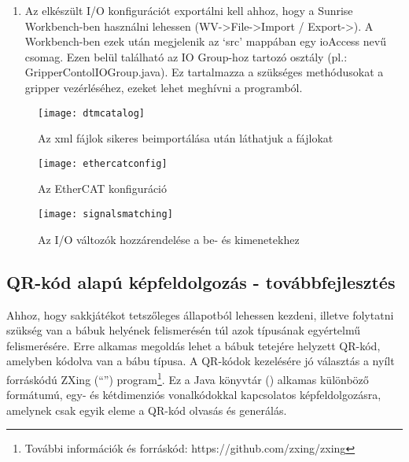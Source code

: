 \documentclass[../documentation.tex]{subfiles}
\begin{document}
\begin{enumerate}
	\begin{itemize}
		\item OpenGripper: bool, output, digital
		\item CloseGripper: bool, output, digital
		\item Status: bool, input, digital
	\end{itemize}
Az egyes változókat a kívánt bemenetekkel és kimenetekkel  módszerrel lehet összerendelni (\ref{fig:signalsmatching}). Megfelelő összekötés esetén a változók mellletti szürke nyilak zölddé változnak.
	\item Az elkészült I/O konfigurációt exportálni kell ahhoz, hogy a Sunrise Workbench-ben használni lehessen (WV->File->Import / Export->). A Workbench-ben ezek után megjelenik az `src' mappában egy ioAccess nevű csomag. Ezen belül található az IO Group-hoz tartozó osztály (pl.: GripperContolIOGroup.java). Ez tartalmazza a szükséges methódusokat a gripper vezérléséhez, ezeket lehet meghívni a programból.
\end{enumerate}

\begin{figure}[p]
\centering
\texttt{[image: dtmcatalog]}
\caption{Az xml fájlok sikeres beimportálása után láthatjuk a  fájlokat}
\label{fig:dtmcatalog}
\end{figure}

\begin{figure}[p]
\centering
\texttt{[image: ethercatconfig]}
\caption{Az EtherCAT konfiguráció}
\label{fig:ethercatconfig}
\end{figure}

\begin{figure}[p]
\centering
\texttt{[image: signalsmatching]}
\caption{Az I/O változók hozzárendelése a be- és kimenetekhez}
\label{fig:signalsmatching}
\end{figure}

\subsection{QR-kód alapú képfeldolgozás - továbbfejlesztés}
Ahhoz, hogy sakkjátékot tetszőleges állapotból lehessen kezdeni, illetve folytatni szükség van a bábuk helyének felismerésén túl azok típusának egyértelmű felismerésére. Erre alkamas megoldás lehet a bábuk tetejére helyzett QR-kód, amelyben kódolva van a bábu típusa. A QR-kódok kezelésére jó választás a nyílt forráskódú ZXing (``'') program\footnote{További információk és forráskód: https://github.com/zxing/zxing}. Ez a Java könyvtár () alkamas különböző formátumú, egy- és kétdimenziós vonalkódokkal kapcsolatos képfeldolgozásra, amelynek csak egyik eleme a QR-kód olvasás és generálás.
\end{document}
